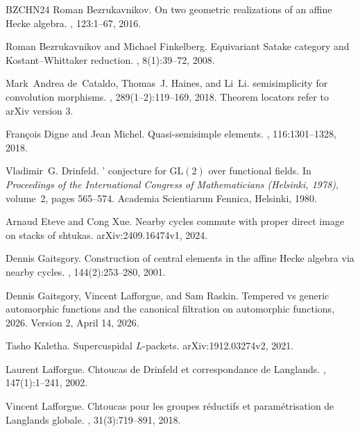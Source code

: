 \documentclass[11pt]{article}
\numberwithin{equation}{section}
\theoremstyle{definition}
\theoremstyle{remark}
\begin{document}
\begin{thebibliography}{BZCHN24}
Roman Bezrukavnikov.
\newblock On two geometric realizations of an affine {Hecke} algebra.
, 123:1--67, 2016.

Roman Bezrukavnikov and Michael Finkelberg.
\newblock Equivariant {Satake} category and {Kostant--Whittaker} reduction.
, 8(1):39--72, 2008.

Mark~Andrea de~Cataldo, Thomas~J. Haines, and Li~Li.
 semisimplicity for convolution morphisms.
, 289(1--2):119--169, 2018.
\newblock Theorem locators refer to arXiv version 3.

Fran{\c c}ois Digne and Jean Michel.
\newblock Quasi-semisimple elements.
, 116:1301--1328,
  2018.

Vladimir~G. Drinfeld.
' conjecture for {$\mathrm{GL}(2)$} over functional
  fields.
\newblock In {\em Proceedings of the International Congress of Mathematicians
  (Helsinki, 1978)}, volume~2, pages 565--574. Academia Scientiarum Fennica,
  Helsinki, 1980.

Arnaud Eteve and Cong Xue.
\newblock Nearby cycles commute with proper direct image on stacks of shtukas.
\newblock arXiv:2409.16474v1, 2024.

Dennis Gaitsgory.
\newblock Construction of central elements in the affine {Hecke} algebra via
  nearby cycles.
, 144(2):253--280, 2001.

Dennis Gaitsgory, Vincent Lafforgue, and Sam Raskin.
\newblock Tempered vs generic automorphic functions and the canonical
  filtration on automorphic functions, 2026.
\newblock Version 2, April 14, 2026.

Tasho Kaletha.
\newblock Supercuspidal {$L$}-packets.
\newblock arXiv:1912.03274v2, 2021.

Laurent Lafforgue.
\newblock Chtoucas de {Drinfeld} et correspondance de {Langlands}.
, 147(1):1--241, 2002.

Vincent Lafforgue.
\newblock Chtoucas pour les groupes r{\'e}ductifs et param{\'e}trisation de
  {Langlands} globale.
, 31(3):719--891,
  2018.


\end{thebibliography}
\end{document}
